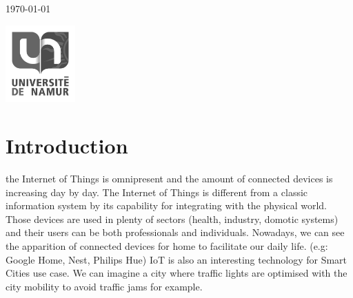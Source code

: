 \documentclass[11pt]{article}
\begin{document}
\begin{titlepage}
	
	
	\vfill\vfill\vfill %
	
	{\large\today} %
	
	
	\vfill\vfill
	\includegraphics[width=0.2\textwidth]{placeholder.png}\\[1cm] %
	 
	
	\vfill %
	
\end{titlepage}



\section{Introduction}

the Internet of Things is omnipresent and the amount of connected devices is increasing day by day. The Internet of Things is different from a classic information system by its capability for integrating with the physical world. Those devices are used in plenty of sectors (health, industry, domotic systems) and their users can be both professionals and individuals. Nowadays, we can see the apparition of connected devices for home to facilitate our daily life. (e.g: Google Home, Nest, Philips Hue) IoT is also an interesting technology for Smart Cities use case. We can imagine a city where traffic lights are optimised with the city mobility to avoid traffic jams for example.
\end{document}

